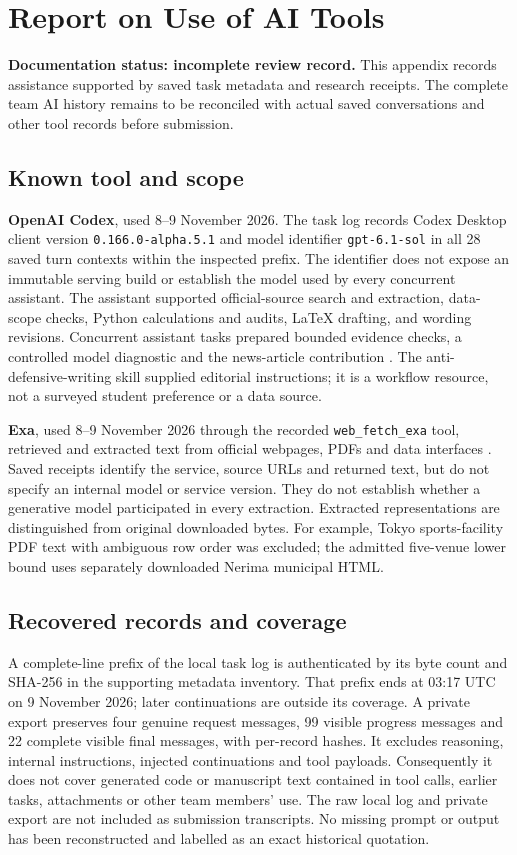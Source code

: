 \section*{Report on Use of AI Tools}
\textbf{Documentation status: incomplete review record.}
This appendix records assistance supported by saved task metadata and research
receipts. The complete team AI history remains to be reconciled with actual
saved conversations and other tool records before submission.

\subsection*{Known tool and scope}
\textbf{OpenAI Codex}, used 8--9 November 2026. The task log records Codex
Desktop client version \texttt{0.166.0-alpha.5.1} and model identifier
\texttt{gpt-6.1-sol} in all 28 saved turn contexts within the inspected prefix.
The identifier does not expose an immutable serving build or establish the
model used by every concurrent assistant. The assistant supported official-source
search and extraction, data-scope checks, Python calculations and audits,
LaTeX drafting, and wording revisions. Concurrent assistant tasks prepared
bounded evidence checks, a controlled model diagnostic and the news-article
contribution \cite{openai}. The anti-defensive-writing skill supplied editorial instructions;
it is a workflow resource, not a surveyed student preference or a data source.

\textbf{Exa}, used 8--9 November 2026 through the recorded
\texttt{web\_fetch\_exa} tool, retrieved and extracted text from official
webpages, PDFs and data interfaces \cite{exa}. Saved receipts identify the
service, source URLs and returned text, but do not specify an internal model
or service version. They do not establish whether a generative model
participated in every extraction. Extracted representations are distinguished
from original downloaded bytes. For example, Tokyo sports-facility PDF text
with ambiguous row order was excluded; the admitted five-venue lower bound
uses separately downloaded Nerima municipal HTML.

\clearpage
\subsection*{Recovered records and coverage}
A complete-line prefix of the local task log is authenticated by its byte count
and SHA-256 in the supporting metadata inventory. That prefix ends at
03:17 UTC on 9 November 2026; later continuations are outside its coverage.
A private export preserves
four genuine request messages, 99 visible progress messages and 22 complete
visible final messages, with per-record hashes. It excludes reasoning, internal
instructions, injected continuations and tool payloads. Consequently it does
not cover generated code or manuscript text contained in tool calls, earlier
tasks, attachments or other team members' use. The raw local log and private
export are not included as submission transcripts. No missing prompt or output
has been reconstructed and labelled as an exact historical quotation.

